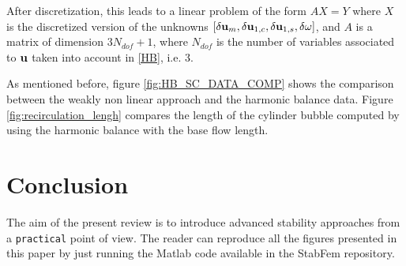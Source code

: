 \documentclass[twocolumn,10pt]{asme2ej}
\begin{document}
\iffalse
\begin{equation}
\begin{array}{ll}
\displaystyle
& {\cal NS}(  {\bf u }_m^g ) - [ {\cal C}( {\bf u }_{1,r}^g,{\bf u }_{1,r}^g) +  {\cal C}( {\bf u }_{1,i}^g,{\bf u }_{1,i}^g) ]
\\
+& {\cal L}_{{\bf u }_0^g}(\delta {\bf u }_0) - 2 [ {\cal C}( {\bf u }_{1,r}^g,\delta {\bf u }_{1,r}) +  {\cal C}( {\bf u }_{1,i}^g,\delta {\bf u }_{1,i}) ] = 0;
\\
\\
&  {\cal L}_{{\bf u }_0^g}( {\bf u }_{1,r}^g) - \omega^g {\bf u }_{1,i}^g 
 \\
  +& {\cal L}_{{\bf u }_0^g}( \delta {\bf u }_{1,r}^g) 
   -  {\cal C}( \delta {\bf u }_{0}^g, {\bf u }_{1,r})
   - \delta \omega^g \delta {\bf u }_{1,i}^g 
 - \omega^g \delta {\bf u }_{1,r} = 0 ;
 \\
\\
&  {\cal L}_{{\bf u }_0^g}({\bf u }_{1,i}^g) + \omega^g {\bf u }_{1,i}^g
 \\
  +& {\cal L}_{{\bf u }_0^g}( \delta {\bf u }_{1,i}^g) 
  -  {\cal C}( \delta {\bf u }_{0}^g, {\bf u }_{1,i}) 
  + \delta \omega^g \delta {\bf u }_{1,i}^g 
+ \omega^g \delta {\bf u }_{1,r} = 0 ;
\\
\\
& F_y({\bf u }_{1,i}^g) + F_y(\delta {\bf u }_{1,i}) = 0.
 \end{array}
\end{equation}
\fi


After discretization, this leads to a linear problem of the form $A X = Y$ where $X$ is the discretized version of the unknowns  $[\delta {\bf u }_m, \delta {\bf u }_{1,c}, \delta {\bf u }_{1,s}, \delta \omega]$, and $A$ is a matrix of dimension $3 N_{dof} +1${\color{red}, where $N_{dof}$ is the number of variables associated to ${\bf u}$ taken into account in \ref{HB}, i.e. 3.} 
 

As mentioned before, figure \ref{fig:HB_SC_DATA_COMP} shows the comparison between the weakly non linear approach and the harmonic balance data.  
Figure \ref{fig:recirculation_lengh} compares the length of the cylinder bubble computed by using the harmonic balance with the base flow length. 




\section{Conclusion}
The aim of the present review is to introduce advanced stability approaches 
from a {\tt practical} point of view. The reader can reproduce all the figures presented 
in this paper by just running the Matlab code available in the StabFem repository. 
\end{document}
